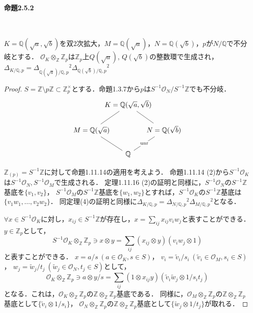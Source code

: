 \paragraph{命題2.5.2}~
\begin{screen}
  $K=\mathbb{Q}(\sqrt{a}, \sqrt{b})$を双$2$次拡大，$M=\mathbb{Q}(\sqrt{a})$，$N=\mathbb{Q}(\sqrt{b})$，$p$が$N/\mathbb{Q}$で不分岐とする．
  $\mathcal{O}_K \otimes_\mathbb{Z} \mathbb{Z}_p$は$\mathbb{Z}_p$上$Q(\sqrt{a})$, $Q(\sqrt{b})$の整数環で生成され，
  $\varDelta_{K/\mathbb{Q}, p}= \varDelta_{\mathbb{Q}(\sqrt{a})/\mathbb{Q}, p}{}^2 \varDelta_{\mathbb{Q}(\sqrt{b})/\mathbb{Q}, p}{}^2$
\end{screen}
\begin{proof}
  $S=\mathbb{Z}\setminus p\mathbb{Z}\subset\mathbb{Z}_p^\times$とする．命題1.3.7から$p$は$S^{-1}\mathcal{O}_N/S^{-1}\mathbb{Z}$でも不分岐．
  \[
  \begin{tikzcd}
    &[-40pt] K=\mathbb{Q}(\sqrt{a}, \sqrt{b}) \arrow[ld, dash]\arrow[rd, dash] \\
    M=\mathbb{Q}(\sqrt{a}) &[-40pt] &[-40pt] N=\mathbb{Q}(\sqrt{b})\\
    &[-40pt] \mathbb{Q} \arrow[ul, dash]\arrow[ur, dash, "\text{unr}" description]
  \end{tikzcd}
  \]

  $\mathbb{Z}_{(p)} = S^{-1}\mathbb{Z}$に対して命題1.11.14の適用を考えよう．
  命題1.11.14 (2)から$S^{-1}\mathcal{O}_K$は$S^{-1}\mathcal{O}_N, S^{-1}\mathcal{O}_M$で生成される．
  定理1.11.16 (2)の証明と同様に，$S^{-1}\mathcal{O}_N$の$S^{-1}\mathbb{Z}$基底を$\{v_1, v_2\}$，
  $S^{-1}\mathcal{O}_M$の$S^{-1}\mathbb{Z}$基底を$\{w_1, w_2\}$とすれば，$S^{-1}\mathcal{O}_K$の$S^{-1}\mathbb{Z}$基底は$\{v_1w_1, \ldots, v_2w_2\}$．
  同定理(4)の証明と同様に$\varDelta_{K/\mathbb{Q}, p}= \varDelta_{N/\mathbb{Q}, p}{}^2\varDelta_{M/\mathbb{Q}, p}{}^2$となる．

  $\forall x\in S^{-1}\mathcal{O}_K$に対し，$x_{ij}\in S^{-1}\mathbb{Z}$が存在し，$x=\sum_{ij}x_{ij}v_iw_j$と表すことができる．
  $y\in\mathbb{Z}_p$として，
  \[S^{-1}\mathcal{O}_K\otimes_\mathbb{Z}\mathbb{Z}_p\ni x \otimes y = \sum_{ij}(x_{ij} \otimes y)(v_iw_j \otimes 1)\]
  と表すことができる．
  $x=a/s\ (a\in\mathcal{O}_K, s\in S)$，
  $v_i=\tilde{v}_i/s_i\ (\tilde{v}_i\in\mathcal{O}_M, s_i\in S)$，
  $w_j=\tilde{w}_j/t_j\ (\tilde{w}_j\in\mathcal{O}_N, t_j\in S)$として，
  \[\mathcal{O}_K\otimes_\mathbb{Z}\mathbb{Z}_p\ni a \otimes y/s=\sum_{ij}(1 \otimes x_{ij}y)(\tilde{v}_i\tilde{w}_j \otimes 1/s_it_j)\]
  となる．これは，$\mathcal{O}_K\otimes_\mathbb{Z}\mathbb{Z}_p$の$\mathbb{Z}\otimes_\mathbb{Z}\mathbb{Z}_p$基底である．
  同様に，$\mathcal{O}_M\otimes_\mathbb{Z}\mathbb{Z}_p$の$\mathbb{Z}\otimes_\mathbb{Z}\mathbb{Z}_p$基底として$\{\tilde{v}_i \otimes 1/s_i\}$，
  $\mathcal{O}_N\otimes_\mathbb{Z}\mathbb{Z}_p$の$\mathbb{Z}\otimes_\mathbb{Z}\mathbb{Z}_p$基底として$\{\tilde{w}_j \otimes 1/t_j\}$が取れる．


\end{proof}
